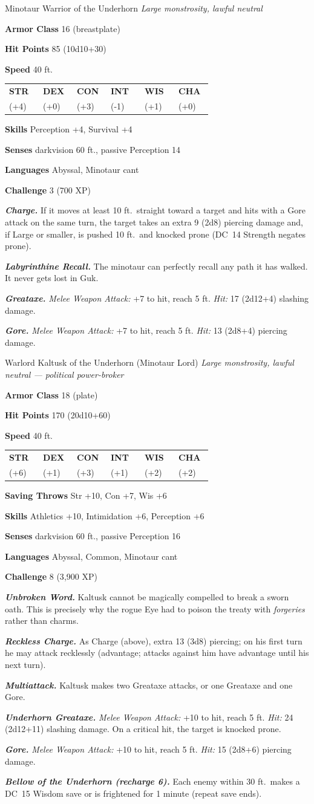 \documentclass[10pt,twoside]{report}
\makeatletter
\newcommand{\msub}[1]{{\itshape #1}\par}
\newcommand{\mrule}{\par\vspace{2pt}{\color{gukred}\rule{\linewidth}{1.1pt}}\par\vspace{2pt}}
\newcommand{\mthin}{\par\vspace{1pt}{\color{gukred!60}\rule{\linewidth}{0.5pt}}\par\vspace{2pt}}
\newcommand{\mfield}[2]{\noindent\textbf{\color{gukred}#1} #2\par}
\newcommand{\mhead}[1]{\par\smallskip{\sffamily\bfseries\scshape\color{gukred}#1}\par
  \vspace{-3pt}{\color{gukred}\rule{\linewidth}{0.7pt}}\par\vspace{2pt}}
\newcommand{\mtrait}[2]{\noindent\textbf{\itshape #1} #2\par\vspace{2pt}}
\newcommand{\abilities}[6]{\par\smallskip\noindent
  {\setlength{\tabcolsep}{1.5pt}%
  \begin{tabular}{@{}*{6}{p{0.15\linewidth}}@{}}
  \centering\sffamily\bfseries\color{gukred}STR &\centering\sffamily\bfseries\color{gukred}DEX
  &\centering\sffamily\bfseries\color{gukred}CON &\centering\sffamily\bfseries\color{gukred}INT
  &\centering\sffamily\bfseries\color{gukred}WIS &\centering\arraybackslash\sffamily\bfseries\color{gukred}CHA\\
  \centering #1 &\centering #2 &\centering #3 &\centering #4 &\centering #5 &\centering\arraybackslash #6\\
  \end{tabular}}\par\smallskip}
\newcommand{\dc}[1]{DC~#1}
\makeatother
\begin{document}
\begin{statblock}{Minotaur Warrior of the Underhorn}
\msub{Large monstrosity, lawful neutral}
\mrule
\mfield{Armor Class}{16 (breastplate)}
\mfield{Hit Points}{85 (10d10+30)}
\mfield{Speed}{40 ft.}
\abilities{19 (+4)}{11 (+0)}{16 (+3)}{9 (-1)}{13 (+1)}{10 (+0)}
\mthin
\mfield{Skills}{Perception +4, Survival +4}
\mfield{Senses}{darkvision 60 ft., passive Perception 14}
\mfield{Languages}{Abyssal, Minotaur cant}
\mfield{Challenge}{3 (700 XP)}
\mrule
\mtrait{Charge.}{If it moves at least 10 ft.\ straight toward a target and hits with a Gore attack on the same turn, the target takes an extra 9 (2d8) piercing damage and, if Large or smaller, is pushed 10 ft.\ and knocked prone (\dc{14} Strength negates prone).}
\mtrait{Labyrinthine Recall.}{The minotaur can perfectly recall any path it has walked. It never gets lost in Guk.}
\mhead{Actions}
\mtrait{Greataxe.}{\textit{Melee Weapon Attack:} +7 to hit, reach 5 ft. \textit{Hit:} 17 (2d12+4) slashing damage.}
\mtrait{Gore.}{\textit{Melee Weapon Attack:} +7 to hit, reach 5 ft. \textit{Hit:} 13 (2d8+4) piercing damage.}
\end{statblock}

\begin{statblock}{Warlord Kaltusk of the Underhorn (Minotaur Lord)}
\msub{Large monstrosity, lawful neutral --- \textnormal{political power-broker}}
\mrule
\mfield{Armor Class}{18 (plate)}
\mfield{Hit Points}{170 (20d10+60)}
\mfield{Speed}{40 ft.}
\abilities{22 (+6)}{12 (+1)}{17 (+3)}{12 (+1)}{15 (+2)}{15 (+2)}
\mthin
\mfield{Saving Throws}{Str +10, Con +7, Wis +6}
\mfield{Skills}{Athletics +10, Intimidation +6, Perception +6}
\mfield{Senses}{darkvision 60 ft., passive Perception 16}
\mfield{Languages}{Abyssal, Common, Minotaur cant}
\mfield{Challenge}{8 (3{,}900 XP)}
\mrule
\mtrait{Unbroken Word.}{Kaltusk cannot be magically compelled to break a sworn oath. This is precisely why the rogue Eye had to poison the treaty with \emph{forgeries} rather than charms.}
\mtrait{Reckless Charge.}{As Charge (above), extra 13 (3d8) piercing; on his first turn he may attack recklessly (advantage; attacks against him have advantage until his next turn).}
\mhead{Actions}
\mtrait{Multiattack.}{Kaltusk makes two Greataxe attacks, or one Greataxe and one Gore.}
\mtrait{Underhorn Greataxe.}{\textit{Melee Weapon Attack:} +10 to hit, reach 5 ft. \textit{Hit:} 24 (2d12+11) slashing damage. On a critical hit, the target is knocked prone.}
\mtrait{Gore.}{\textit{Melee Weapon Attack:} +10 to hit, reach 5 ft. \textit{Hit:} 15 (2d8+6) piercing damage.}
\mtrait{Bellow of the Underhorn (recharge 6).}{Each enemy within 30 ft.\ makes a \dc{15} Wisdom save or is frightened for 1 minute (repeat save ends).}
\end{statblock}
\end{document}

